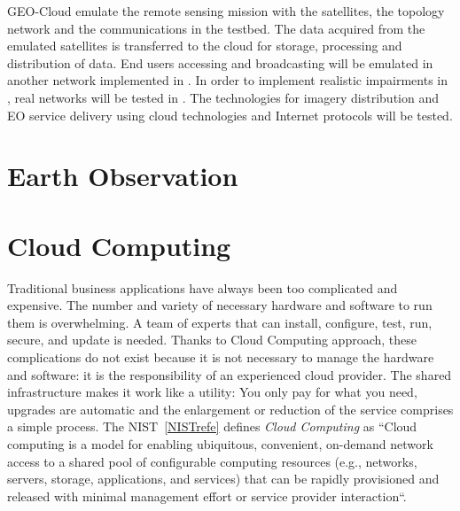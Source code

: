 GEO-Cloud  emulate the remote sensing mission with the satellites, the
topology network and the communications in the \vw testbed. The data
acquired from the emulated satellites is transferred to the \bonfire cloud
for storage, processing and distribution of data. End users accessing and
broadcasting will be emulated in another network implemented in \vw. In
order to implement realistic impairments in \vw, real networks will be
tested in \pl.  The technologies for imagery distribution and \ac{EO}
service delivery using cloud technologies and Internet protocols will be tested.

\section{Earth Observation}


\section{Cloud Computing}

Traditional business applications have always been too complicated and
expensive. The number and variety of necessary hardware and software to run them
is overwhelming. A team of experts that can install, configure, test, run,
secure, and update is needed.  Thanks to Cloud Computing approach, these
complications do not exist because it is not necessary to manage the hardware
and software: it is the responsibility of an experienced cloud provider. The
shared infrastructure makes it work like a utility: You only pay for what you
need, upgrades are automatic and the enlargement or reduction of the service
comprises a simple process.
The NIST~\ref{NISTrefe} defines \emph{Cloud Computing} as ``Cloud computing is a model for enabling ubiquitous, convenient, on-demand network access to a shared 
pool of configurable computing resources (e.g., networks, servers, storage, applications, and services) that 
can be rapidly provisioned and released with minimal management effort or
service provider interaction``.

